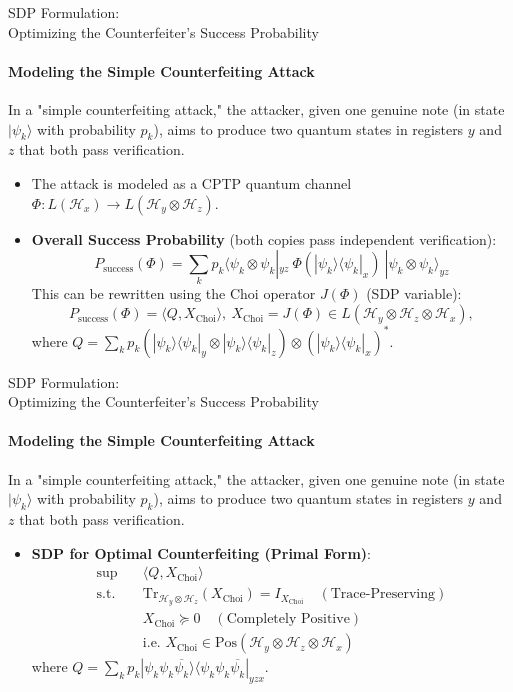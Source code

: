 \documentclass{beamer}
\begin{document}
\begin{frame}{SDP Formulation: \\Optimizing the Counterfeiter's Success Probability}
    \framesubtitle{Modeling the Simple Counterfeiting Attack}
    In a "simple counterfeiting attack," the attacker, given one genuine note (in state $|\psi_k\rangle$ with probability $p_k$), aims to produce two quantum states in registers $y$ and $z$ that both pass verification.
    \pause
    \begin{itemize}
        \item The attack is modeled as a CPTP quantum channel $\Phi: L(\mathcal{H}_x) \to L(\mathcal{H}_y \otimes \mathcal{H}_z)$.
        \item \textbf{Overall Success Probability} (both copies pass independent verification):
        $$ P_{\text{success}}(\Phi) = \sum_k p_k \langle \psi_k \otimes \psi_k |_{yz}\ \Phi(|\psi_k\rangle\langle\psi_k|_x)\ | \psi_k \otimes \psi_k \rangle_{yz} $$
        This can be rewritten using the Choi operator $J(\Phi)$ (SDP variable):
        $$ P_{\text{success}}(\Phi) = \langle Q,X_{\text{Choi}}\rangle,\ X_{\text{Choi}}=J(\Phi)\in L(\mathcal{H}_y \otimes \mathcal{H}_z \otimes \mathcal{H}_x),$$
        where $Q = \sum_k p_k (|\psi_k\rangle\langle\psi_k|_y \otimes |\psi_k\rangle\langle\psi_k|_z) \otimes (|\psi_k\rangle\langle\psi_k|_x)^*$.
    \end{itemize}
\end{frame}

\begin{frame}{SDP Formulation: \\Optimizing the Counterfeiter's Success Probability}
    \framesubtitle{Modeling the Simple Counterfeiting Attack}
    In a "simple counterfeiting attack," the attacker, given one genuine note (in state $|\psi_k\rangle$ with probability $p_k$), aims to produce two quantum states in registers $y$ and $z$ that both pass verification.
    \begin{itemize}
        \item \textbf{SDP for Optimal Counterfeiting (Primal Form)}:
        \begin{align*}
            \sup \quad & \langle Q, X_{\text{Choi}} \rangle \\
            \text{s.t.} \quad & \mathrm{Tr}_{\mathcal{H}_y \otimes \mathcal{H}_z}(X_{\text{Choi}}) = I_{X_{\text{Choi}}} \quad (\text{Trace-Preserving}) \\
            & X_{\text{Choi}} \succeq 0 \quad (\text{Completely Positive})\\
            &\text{i.e. }X_{\text{Choi}}\in\text{Pos}(\mathcal{H}_y \otimes \mathcal{H}_z \otimes \mathcal{H}_x)
        \end{align*}
        where $Q = \sum_k p_k |\psi_k \psi_k \overline{\psi_k} \rangle \langle \psi_k \psi_k \overline{\psi_k} |_{yzx}.$
    \end{itemize}
\end{frame}
\end{document}

